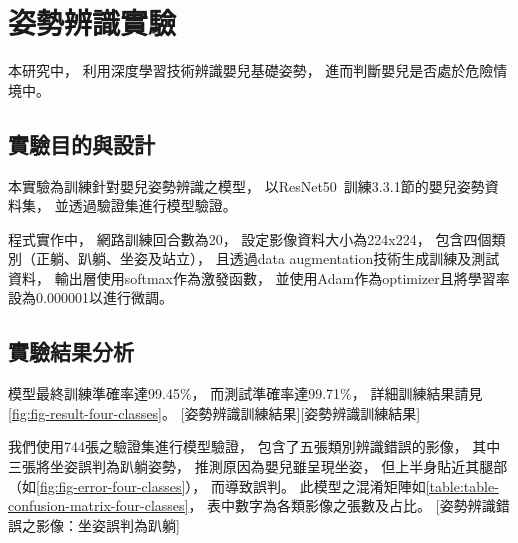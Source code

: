 \documentclass[class=NCU_thesis, crop=false]{standalone}
\begin{document}
\section{姿勢辨識實驗}
本研究中，
利用深度學習技術辨識嬰兒基礎姿勢，
進而判斷嬰兒是否處於危險情境中。

\subsection{實驗目的與設計}
本實驗為訓練針對嬰兒姿勢辨識之模型，
以ResNet50~\cite{he_deep_2016}訓練3.3.1節的嬰兒姿勢資料集，
並透過驗證集進行模型驗證。

程式實作中，
網路訓練回合數為20，
設定影像資料大小為224x224，
包含四個類別（正躺、趴躺、坐姿及站立），
且透過data augmentation技術生成訓練及測試資料，
輸出層使用softmax作為激發函數，
並使用Adam作為optimizer且將學習率設為0.000001以進行微調。

\subsection{實驗結果分析}
模型最終訓練準確率達99.45\%，
而測試準確率達99.71\%，
詳細訓練結果請見\cref{fig:fig-result-four-classes}。
[姿勢辨識訓練結果][姿勢辨識訓練結果]

我們使用744張之驗證集進行模型驗證，
包含了五張類別辨識錯誤的影像，
其中三張將坐姿誤判為趴躺姿勢，
推測原因為嬰兒雖呈現坐姿，
但上半身貼近其腿部（如\cref{fig:fig-error-four-classes}），
而導致誤判。
此模型之混淆矩陣如\cref{table:table-confusion-matrix-four-classes}，
表中數字為各類影像之張數及占比。
[姿勢辨識錯誤之影像：坐姿誤判為趴躺]
\end{document}
